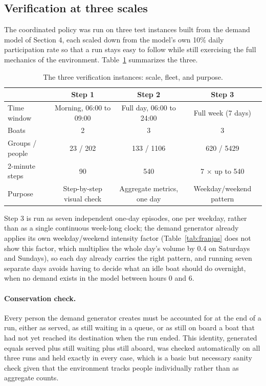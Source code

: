 \documentclass[11pt,a4paper]{article}
\begin{document}
\subsection{Verification at three scales}
\label{sec:escalones}

The coordinated policy was run on three test instances built from the demand model of Section 4, each scaled down from the model's own 10\% daily participation rate so that a run stays easy to follow while still exercising the full mechanics of the environment. Table~\ref{tab:escalones} summarizes the three.

\begin{table}[H]
\centering
\caption{The three verification instances: scale, fleet, and purpose.}
\label{tab:escalones}
\footnotesize
\begin{tabular}{lccc}
\toprule
 & Step 1 & Step 2 & Step 3 \\
\midrule
Time window & Morning, 06:00 to 09:00 & Full day, 06:00 to 24:00 & Full week (7 days) \\
Boats & 2 & 3 & 3 \\
Groups / people & 23 / 202 & 133 / 1106 & 620 / 5429 \\
2-minute steps & 90 & 540 & 7 $\times$ up to 540 \\
Purpose & Step-by-step visual check & Aggregate metrics, one day & Weekday/weekend pattern \\
\bottomrule
\end{tabular}
\end{table}

Step 3 is run as seven independent one-day episodes, one per weekday, rather than as a single continuous week-long clock; the demand generator already applies its own weekday/weekend intensity factor (Table~\ref{tab:franjas} does not show this factor, which multiplies the whole day's volume by 0.4 on Saturdays and Sundays), so each day already carries the right pattern, and running seven separate days avoids having to decide what an idle boat should do overnight, when no demand exists in the model between hours 0 and 6.

\paragraph{Conservation check.} Every person the demand generator creates must be accounted for at the end of a run, either as served, as still waiting in a queue, or as still on board a boat that had not yet reached its destination when the run ended. This identity, generated equals served plus still waiting plus still aboard, was checked automatically on all three runs and held exactly in every case, which is a basic but necessary sanity check given that the environment tracks people individually rather than as aggregate counts.
\end{document}
